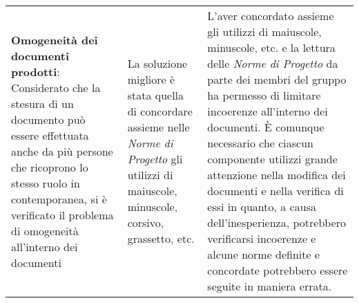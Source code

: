 \begin{longtable}{ 
				>{\centering}p{}
				>{\centering}p{}
				>{\centering\arraybackslash}p{}}
				\textbf{Omogeneità dei documenti prodotti}: Considerato che la stesura di un documento può essere effettuata anche da più persone che ricoprono lo stesso ruolo in contemporanea, si è verificato il problema di omogeneità all'interno dei documenti
					&
				La soluzione migliore è stata quella di concordare assieme nelle \textit{Norme di Progetto} gli utilizzi di maiuscole, minuscole, corsivo, grassetto, etc.
					&
				L'aver concordato assieme gli utilizzi di maiuscole, minuscole, etc. e la lettura delle \textit{Norme di Progetto} da parte dei membri del gruppo ha permesso di limitare incoerenze all'interno dei documenti. È comunque necessario che ciascun componente utilizzi grande attenzione nella modifica dei documenti e nella verifica di essi in quanto, a causa dell'inesperienza, potrebbero verificarsi incoerenze e alcune norme definite e concordate potrebbero essere seguite in maniera errata.
					\\
				
			\end{longtable}
	
	
		
	
	
	